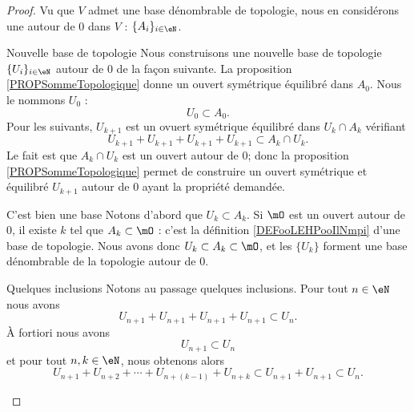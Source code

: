 \begin{proof}
    Vu que \( V\) admet une base dénombrable de topologie, nous en considérons une autour de \( 0\) dans \( V\) : \( \{ A_i \}_{i\in \eN}\).

    \begin{subproof}
    \item[Nouvelle base de topologie]
        Nous construisons une nouvelle base de topologie \( \{ U_i \}_{i\in \eN}\) autour de \( 0\) de la façon suivante. La proposition \ref{PROPSommeTopologique} donne un ouvert symétrique équilibré dans \( A_0\). Nous le nommons \( U_0\) :
        \begin{equation}
            U_0\subset A_0.
        \end{equation}
        Pour les suivants, \( U_{k+1}\) est un ovuert symétrique équilibré dans \( U_{k}\cap A_k\) vérifiant
        \begin{equation}
                U_{k+1}+U_{k+1}+U_{k+1}+U_{k+1}\subset A_k\cap U_{k}.       \label{EQooECMVooLllLhu}
        \end{equation}
        Le fait est que \( A_k\cap U_k\) est un ouvert autour de \( 0\); donc la proposition \ref{PROPSommeTopologique} permet de construire un ouvert symétrique et équilibré \( U_{k+1}\) autour de \( 0\) ayant la propriété demandée.

    \item[C'est bien une base]
        Notons d'abord que \( U_k\subset A_k\). Si \( \mO\) est un ouvert autour de \( 0\), il existe \( k\) tel que \( A_k\subset \mO\) : c'est la définition \ref{DEFooLEHPooIlNmpi} d'une base de topologie. Nous avons donc \( U_k\subset A_k\subset \mO\), et les \( \{ U_k \}\) forment une base dénombrable de la topologie autour de \( 0\).
        \item[Quelques inclusions]
            Notons au passage quelques inclusions. Pour tout \( n\in \eN\) nous avons
            \begin{equation}    \label{EqBaseTopoMetriquePf1}
                U_{n+1} + U_{n+1} + U_{n+1} + U_{n+1} \subset U_n.
            \end{equation}
            À fortiori nous avons 
            \begin{equation}        \label{EQooARBRooOiAVhH}
                U_{n+1}\subset U_n
            \end{equation}
            et pour tout \( n,k\in \eN\), nous obtenons alors
            \begin{equation}\label{EqBaseTopoMetriquePf2}
                U_{n+1} + U_{n+2} + \cdots  + U_{n+(k-1)} + U_{n+k} \subset  U_{n+1} + U_{n+1} \subset U_n.
            \end{equation}


\end{subproof}
\end{proof}
